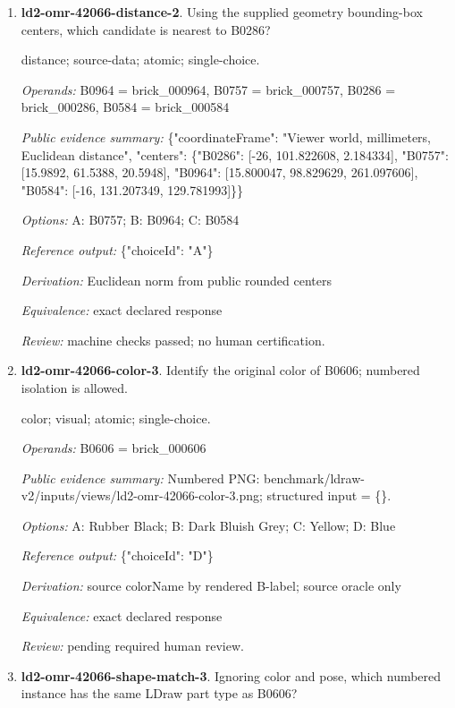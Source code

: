 \begin{enumerate}
\item \textbf{ld2-omr-42066-distance-2}. Using the supplied geometry bounding-box centers, which candidate is nearest to B0286?
\par{\small distance; source-data; atomic; single-choice.\par\textit{Operands:} B0964 = brick\_000964, B0757 = brick\_000757, B0286 = brick\_000286, B0584 = brick\_000584\par\textit{Public evidence summary:} \{"coordinateFrame": "Viewer world, millimeters, Euclidean distance", "centers": \{"B0286": [-26, 101.822608, 2.184334], "B0757": [15.9892, 61.5388, 20.5948], "B0964": [15.800047, 98.829629, 261.097606], "B0584": [-16, 131.207349, 129.781993]\}\}\par\textit{Options:} A: B0757; B: B0964; C: B0584\par\textit{Reference output:} \{"choiceId": "A"\}\par\textit{Derivation:} Euclidean norm from public rounded centers\par\textit{Equivalence:} exact declared response\par\textit{Review:} machine checks passed; no human certification.}
\item \textbf{ld2-omr-42066-color-3}. Identify the original color of B0606; numbered isolation is allowed.
\par{\small color; visual; atomic; single-choice.\par\textit{Operands:} B0606 = brick\_000606\par\textit{Public evidence summary:} Numbered PNG: benchmark/ldraw-v2/inputs/views/ld2-omr-42066-color-3.png; structured input = \{\}.\par\textit{Options:} A: Rubber Black; B: Dark Bluish Grey; C: Yellow; D: Blue\par\textit{Reference output:} \{"choiceId": "D"\}\par\textit{Derivation:} source colorName by rendered B-label; source oracle only\par\textit{Equivalence:} exact declared response\par\textit{Review:} pending required human review.}
\item \textbf{ld2-omr-42066-shape-match-3}. Ignoring color and pose, which numbered instance has the same LDraw part type as B0606?

\end{enumerate}
